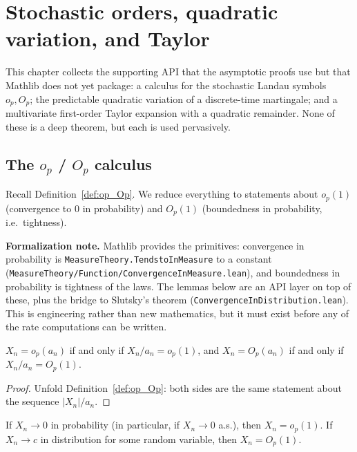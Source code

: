 \chapter{Stochastic orders, quadratic variation, and Taylor}
\label{chap:pre_orders}

This chapter collects the supporting API that the asymptotic proofs use but that
Mathlib does not yet package: a calculus for the stochastic Landau symbols
$o_p, O_p$; the predictable quadratic variation of a discrete-time martingale;
and a multivariate first-order Taylor expansion with a quadratic remainder. None
of these is a deep theorem, but each is used pervasively.

\section{The \texorpdfstring{$o_p$}{op} / \texorpdfstring{$O_p$}{Op} calculus}
\label{sec:pre_op}

Recall Definition~\ref{def:op_Op}. We reduce everything to statements about
$o_p(1)$ (convergence to $0$ in probability) and $O_p(1)$ (boundedness in
probability, i.e.\ tightness).

\textbf{Formalization note.} Mathlib provides the primitives: convergence in
probability is \texttt{MeasureTheory.TendstoInMeasure} to a constant
(\texttt{MeasureTheory/Function/ConvergenceInMeasure.lean}), and boundedness in
probability is tightness of the laws. The lemmas below are an API layer on top of
these, plus the bridge to Slutsky's theorem
(\texttt{ConvergenceInDistribution.lean}). This is engineering rather than new
mathematics, but it must exist before any of the rate computations can be
written.

\begin{lemma}\label{lem:op_factor}
$X_n = o_p(a_n)$ if and only if $X_n/a_n = o_p(1)$, and $X_n = O_p(a_n)$ if and
only if $X_n/a_n = O_p(1)$.
\end{lemma}

\begin{proof}
Unfold Definition~\ref{def:op_Op}: both sides are the same statement about the
sequence $|X_n|/a_n$.
\end{proof}

\begin{lemma}\label{lem:op_of_tendsto}
If $X_n \to 0$ in probability (in particular, if $X_n \to 0$ a.s.), then
$X_n = o_p(1)$. If $X_n \to c$ in distribution for some random variable, then
$X_n = O_p(1)$.
\end{lemma}

